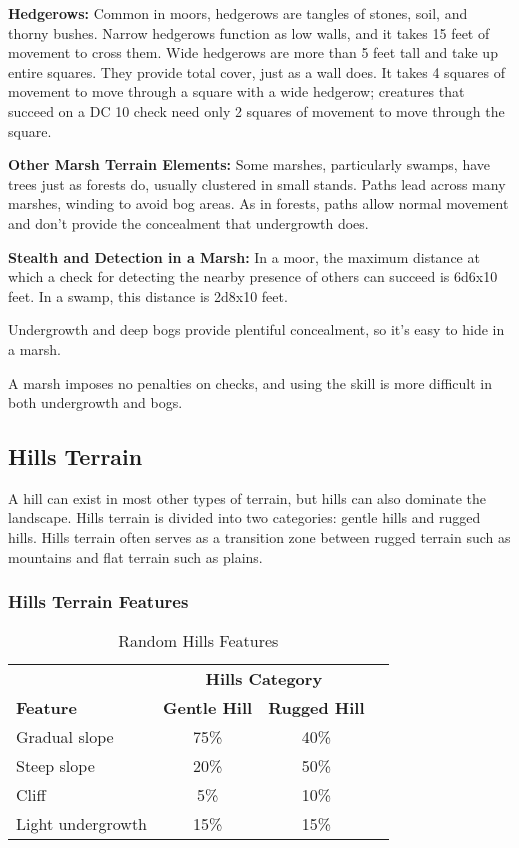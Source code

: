 \textbf{Hedgerows:} Common in moors, hedgerows are tangles of stones, soil, and 
thorny bushes. Narrow hedgerows function as low walls, and it takes 15 feet of 
movement to cross them. Wide hedgerows are more than 5 feet tall and take up entire 
squares. They provide total cover, just as a wall does. It takes 4 squares of movement 
to move through a square with a wide hedgerow; creatures that succeed on a DC 10 
 check need only 2 squares of movement to move through the square.

\textbf{Other Marsh Terrain Elements:} Some marshes, particularly swamps, have 
trees just as forests do, usually clustered in small stands. Paths lead across 
many marshes, winding to avoid bog areas. As in forests, paths allow normal movement 
and don't provide the concealment that undergrowth does.

\textbf{Stealth and Detection in a Marsh:} In a moor, the maximum distance at which 
a  check for detecting the nearby presence of others can succeed is 6d6x10 
feet. In a swamp, this distance is 2d8x10 feet.

Undergrowth and deep bogs provide plentiful concealment, so it's easy to hide in 
a marsh.

A marsh imposes no penalties on  checks, and using the  skill 
is more difficult in both undergrowth and bogs.

\subsection{Hills Terrain}

A hill can exist in most other types of terrain, but hills can also dominate the 
landscape. Hills terrain is divided into two categories: gentle hills and rugged 
hills. Hills terrain often serves as a transition zone between rugged terrain such 
as mountains and flat terrain such as plains.

\subsubsection{Hills Terrain Features}

\begin{table}[htb]
\caption{Random Hills Features}
\centering
\begin{tabular}{l c c c}
 & \multicolumn{2}{c}{\textbf{Hills Category}}\\
\textbf{Feature} & \textbf{Gentle Hill} & \textbf{Rugged Hill}\\
Gradual slope & 75\% & 40\%\\
Steep slope & 20\% & 50\%\\
Cliff & 5\% & 10\%\\
Light undergrowth & 15\% & 15\%\\
\end{tabular}
\end{table}

